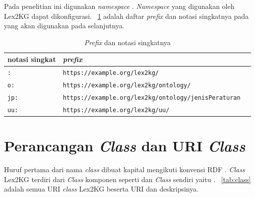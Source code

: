 Pada penelitian ini digunakan \textit{namespace} .
\textit{Namespace} yang digunakan oleh Lex2KG dapat dikonfigurasi. \tab~\ref{tab:prefixes} adalah
daftar \textit{prefix} dan notasi singkatnya pada yang akan digunakan pada selanjutnya.

\begin{table}
  \centering
  \begin{tabular}{|l|l|l|} \hline
    notasi singkat & \textit{prefix}                                             \\ \hline \hline
    \texttt{:}     & \texttt{https://example.org/lex2kg/}                        \\ \hline
    \texttt{o:}    & \texttt{https://example.org/lex2kg/ontology/}               \\ \hline
    \texttt{jp:}   & \texttt{https://example.org/lex2kg/ontology/jenisPeraturan} \\ \hline
    \texttt{uu:}   & \texttt{https://example.org/lex2kg/uu/}                     \\ \hline
  \end{tabular}
  \caption{\textit{Prefix} dan notasi singkatnya}
  \label{tab:prefixes}
\end{table}

\section{Perancangan \textit{Class} dan URI \textit{Class}}
\label{sec:perancangan-uri-class}

Huruf pertama dari nama \textit{class} dibuat kapital mengikuti konvensi RDF \citep{rdf_spec}.
\textit{Class} Lex2KG terdiri dari \textit{Class} komponen \legal seperti  dan
\textit{Class} \legal sendiri yaitu . \tab~\ref{tab:class} adalah semua URI
\textit{class} Lex2KG beserta URI dan deskripsinya.

